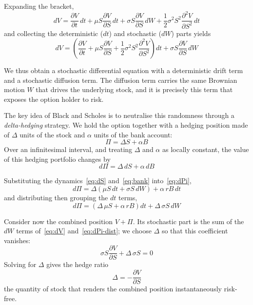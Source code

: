 \documentclass[a4paper,12pt]{article}
\numberwithin{equation}{section}
\begin{document}
Expanding the bracket,
\begin{equation}\label{eq:ito-expand}
  dV = \frac{\partial V}{\partial t}\,dt
     + \mu S\frac{\partial V}{\partial S}\,dt
     + \sigma S\frac{\partial V}{\partial S}\,dW
     + \frac{1}{2}\sigma^2 S^2\frac{\partial^2 V}{\partial S^2}\,dt 
\end{equation}
and collecting the deterministic ($dt$) and stochastic ($dW$) parts yields
\begin{equation}\label{eq:dV}
  dV = \left(\frac{\partial V}{\partial t}
     + \mu S\frac{\partial V}{\partial S}
     + \frac{1}{2}\sigma^2 S^2\frac{\partial^2 V}{\partial S^2}\right)dt
     + \sigma S\frac{\partial V}{\partial S}\,dW 
\end{equation}

We thus obtain a stochastic differential equation with a deterministic drift term
and a stochastic diffusion term. The diffusion term carries the same Brownian
motion $W$ that drives the underlying stock, and it is precisely this term that
exposes the option holder to risk.

The key idea of Black and Scholes is to neutralise this randomness through a
\emph{delta-hedging} strategy. We hold the option together with a hedging
position made of $\Delta$ units of the stock and $\alpha$ units of the bank
account:
\begin{equation}\label{eq:portfolio}
  \Pi = \Delta S + \alpha B 
\end{equation}
Over an infinitesimal interval, and treating $\Delta$ and $\alpha$ as locally
constant, the value of this hedging portfolio changes by
\begin{equation}\label{eq:dPi}
  d\Pi = \Delta\,dS + \alpha\,dB 
\end{equation}

Substituting the dynamics~\eqref{eq:dS} and~\eqref{eq:bank} into~\eqref{eq:dPi},
\begin{equation}\label{eq:dPi-sub}
  d\Pi = \Delta\left(\mu S\,dt + \sigma S\,dW\right) + \alpha\,r B\,dt 
\end{equation}
and distributing then grouping the $dt$ terms,
\begin{equation}\label{eq:dPi-dist}
  d\Pi = \left(\Delta\,\mu S + \alpha\,r B\right)dt + \Delta\,\sigma S\,dW 
\end{equation}

Consider now the combined position $V + \Pi$. Its stochastic part is the sum of
the $dW$ terms of~\eqref{eq:dV} and~\eqref{eq:dPi-dist}; we choose $\Delta$ so
that this coefficient vanishes:
\begin{equation}\label{eq:delta-cond}
  \sigma S\frac{\partial V}{\partial S} + \Delta\,\sigma S = 0 
\end{equation}
Solving for $\Delta$ gives the hedge ratio
\begin{equation}\label{eq:delta}
  \Delta = -\frac{\partial V}{\partial S} 
\end{equation}
the quantity of stock that renders the combined position instantaneously
risk-free.
\end{document}

